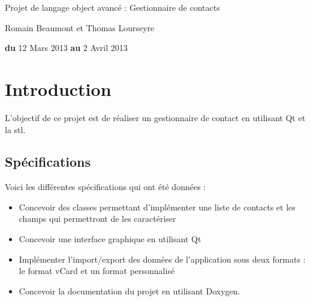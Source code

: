 \documentclass[a4paper,12pt]{report}
\begin{document}
\begin{titlepage}
\begin{center}
\end{center}

\flushright
\begin{center}
\bigskip
\bigskip
\bigskip
\bigskip
\bigskip
\bigskip
\bigskip
\bigskip
\bigskip
\bigskip
\bigskip
\bigskip
\huge{Projet de langage object avancé : Gestionnaire de contacts}\\
\end{center}
\begin{center}
\bigskip
\bigskip
\bigskip
\bigskip
\bigskip
\bigskip
\bigskip
\bigskip
\bigskip
Romain Beaumont et Thomas Lourseyre\\
\bigskip
\bigskip
\bigskip
\bigskip
\bigskip
\bigskip
\bigskip
\bigskip
\bigskip
\bigskip
\bigskip
\bigskip
\bigskip
\bigskip
\bigskip

\textbf{du} 12 Mars 2013  \textbf{au} 2 Avril 2013

\bigskip
\bigskip
\bigskip
\end{center}
\end{titlepage}
 
\tableofcontents


\chapter{Introduction}
\par
L'objectif de ce projet est de réaliser un gestionnaire de contact en utilisant Qt et la stl.

\section{Spécifications}

Voici les différentes spécifications qui ont été données :
\begin{itemize}
	\item Concevoir des classes permettant d'implémenter une liste de contacts et les champs qui permettront de les caractériser
	\item Concevoir une interface graphique en utilisant Qt
	\item Implémenter l'import/export des données de l'application sous deux formats : le format vCard et un format personnalisé
	\item Concevoir la documentation du projet en utilisant Doxygen.\\
\end{itemize}
\end{document}

